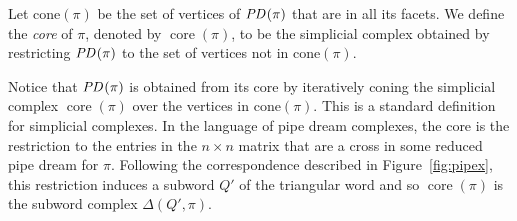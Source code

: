 \documentclass[ALCO,ThmDefs]{cedram}
\numberwithin{equation}{section}
\DeclareMathOperator{\core}{core}
\newcommand*\+{\smash{\lower2pt\hbox{\rlap{\vrule height14pt}}\raise2pt\hbox{\rlap{\hskip-3pt \vrule height.4pt depth0pt width14.7pt}}}}
\newcommand*{\MK}{\mkern 2mu}
\DeclareMathOperator{\PD}{\textit{PD}\MK}
\begin{document}
\begin{defi}\label{def:cone}
Let cone$(\pi)$ be the set of vertices of $\PD(\pi)$ that are in all its facets. We define the \emph{core} of $\pi$, denoted by $\core(\pi)$, to be the simplicial complex obtained by restricting $\PD(\pi)$ to the set of vertices not in cone$(\pi)$.
\end{defi}

Notice that $\PD(\pi)$ is obtained from its core by iteratively coning the simplicial complex $\core(\pi)$ over the vertices in cone$(\pi)$. This is a standard definition for simplicial complexes. In the language of pipe dream complexes, the core is the restriction to the entries in the $n\times n$ matrix that are a cross in some reduced pipe dream for $\pi$. Following the correspondence described in Figure~\ref{fig:pipex}, this restriction induces a subword $Q'$ of the triangular word and so $\core(\pi)$ is the subword complex $\Delta(Q',\pi)$.
\end{document}
